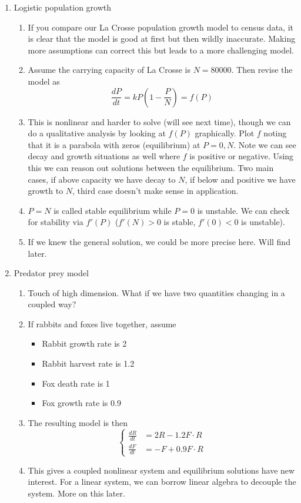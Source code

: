 \documentclass{article}
\begin{document}
\begin{enumerate}
\begin{enumerate}
\item Logistic population growth
\begin{enumerate}
\item If you compare our La Crosse population growth model to census data, it is clear that the model is good at first but then wildly inaccurate. Making more assumptions can correct this but leads to a more challenging model.
\item Assume the carrying capacity of La Crosse is $N=80000$. Then revise the model as
\[
\frac{dP}{dt} = kP\left(1-\frac{P}{N}\right) = f(P)
\]
\item This is nonlinear and harder to solve (will see next time), though we can do a qualitative analysis by looking at $f(P)$ graphically. Plot $f$ noting that it is a parabola with zeros (equilibrium) at $P=0,N$. Note we can see decay and growth situations as well where $f$ is positive or negative. Using this we can reason out solutions between the equilibrium. Two main cases, if above capacity we have decay to $N$, if below and positive we have growth to $N$, third case doesn't make sense in application. 
\item $P=N$ is called stable equilibrium while $P=0$ is unstable. We can check for stability via $f'(P)$ ($f'(N)>0$ is stable, $f'(0)<0$ is unstable).   
\item If we knew the general solution, we could be more precise here. Will find later. 
\end{enumerate}

\item Predator prey model
\begin{enumerate}
\item Touch of high dimension. What if we have two quantities changing in a coupled way?
\item If rabbits and foxes live together, assume
\begin{itemize}
\item Rabbit growth rate is 2
\item Rabbit harvest rate is 1.2
\item Fox death rate is 1
\item Fox growth rate is 0.9
\end{itemize}
\item The resulting model is then
\[
\begin{cases}
\frac{dR}{dt} &= 2R-1.2 F\cdot R\\
\frac{dF}{dt} &= -F+0.9 F \cdot R 
\end{cases}
\]
\item This gives a coupled nonlinear system and equilibrium solutions have new interest. For a linear system, we can borrow linear algebra to decouple the system. More on this later.
\end{enumerate}


\end{enumerate}
\end{enumerate}
\end{document}

